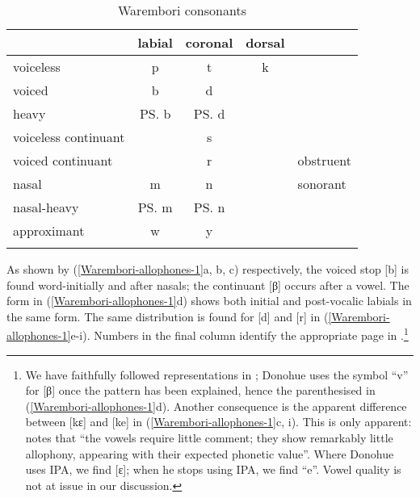 \begin{table}
\caption{Warembori consonants\label{Warembori-Cs}} 
\begin{tabular}{l ccc l}
\lsptoprule
			&{labial}	&{coronal}	&dorsal\\\midrule
voiceless 	&p 		&t 			&k\\
voiced		&b		&d		\\
heavy		&\ps b	&\ps d	\\
voiceless continuant	&		&s	\\
voiced continuant	&\B		&r	&&obstruent\\
\midrule
nasal 		&m		&n	&&sonorant \\ 
nasal-heavy	&\ps m	&\ps n\\
approximant	&w 		&y \\
\lspbottomrule
\end{tabular}
\end{table}


As shown by (\ref{Warembori-allophones-1}a, b, c) respectively, the voiced stop [b] is found word-initially and after nasals; the continuant [β] occurs after a vowel. The form in (\ref{Warembori-allophones-1}d) shows both  initial and post-vocalic labials in the same form. The same distribution is found for [d] and [r] in (\ref{Warembori-allophones-1}e-i). Numbers in the final column identify the appropriate page in \citet{Donohue:1999}.\footnote{We have faithfully followed representations in \citet{Donohue:1999}; Donohue uses the symbol ``v'' for [β] once the pattern has been explained, hence the parenthesised \textit{} in (\ref{Warembori-allophones-1}d). Another consequence is the apparent difference between [kɛ] and [ke] in (\ref{Warembori-allophones-1}c, i). This is only apparent: \citet[6]{Donohue:1999} notes that ``the vowels require little comment; they show remarkably little allophony, appearing with their expected phonetic value''. Where Donohue uses IPA, we find [ɛ]; when he stops using  IPA, we find ``e''. Vowel quality is not at issue in our discussion.}


